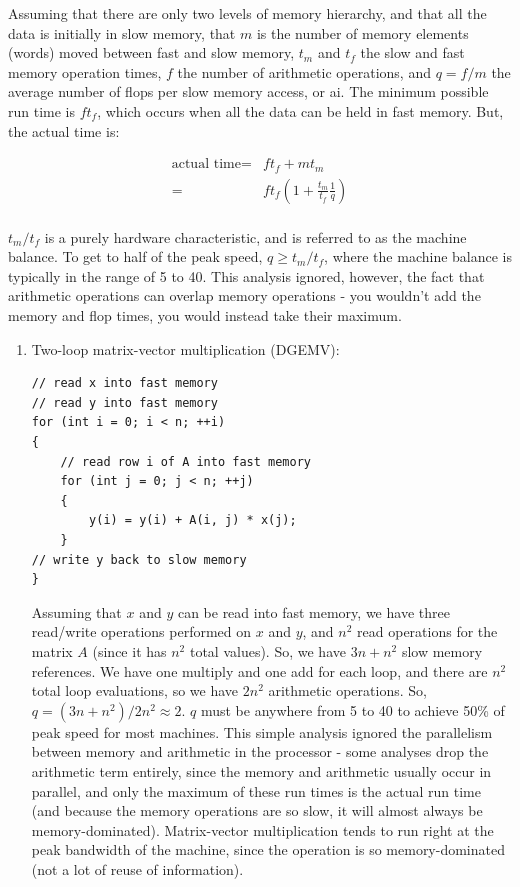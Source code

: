 \documentclass[10pt]{article}
\begin{document}
\begin{flushleft}
Assuming that there are only two levels of memory hierarchy, and that all the data is initially in slow memory, that \(m\) is the number of memory elements (words) moved between fast and slow memory, \(t_m\) and \(t_f\) the slow and fast memory operation times, \(f\) the number of arithmetic operations, and \(q=f/m\) the average number of flops per slow memory access, or \gls{ai}. The minimum possible run time is \(ft_f\), which occurs when all the data can be held in fast memory. But, the actual time is:

\begin{equation}
\begin{aligned}
\textrm{actual time}=& ft_f+mt_m\\
=& ft_f\left(1+\frac{t_m}{t_f}\frac{1}{q}\right)\\
\end{aligned}
\end{equation}

\(t_m/t_f\) is a purely hardware characteristic, and is referred to as the machine balance. To get to half of the peak speed, \(q\geq t_m/t_f\), where the machine balance is typically in the range of 5 to 40. This analysis ignored, however, the fact that arithmetic operations can overlap memory operations - you wouldn't add the memory and flop times, you would instead take their maximum.

\begin{enumerate}
\item Two-loop matrix-vector multiplication (DGEMV):

\begin{lstlisting}[basicstyle=\ttfamily\small]
// read x into fast memory
// read y into fast memory
for (int i = 0; i < n; ++i)
{
	// read row i of A into fast memory
	for (int j = 0; j < n; ++j)
	{
		y(i) = y(i) + A(i, j) * x(j);
	}
// write y back to slow memory
}
\end{lstlisting}

Assuming that \(x\) and \(y\) can be read into fast memory, we have three read/write operations performed on \(x\) and \(y\), and \(n^2\) read operations for the matrix \(A\) (since it has \(n^2\) total values). So, we have \(3n+n^2\) slow memory references. We have one multiply and one add for each loop, and there are \(n^2\) total loop evaluations, so we have \(2n^2\) arithmetic operations. So, \(q=(3n+n^2)/2n^2\approx2\). \(q\) must be anywhere from 5 to 40 to achieve 50\% of peak speed for most machines. This simple analysis ignored the parallelism between memory and arithmetic in the processor - some analyses drop the arithmetic term entirely, since the memory and arithmetic usually occur in parallel, and only the maximum of these run times is the actual run time (and because the memory operations are so slow, it will almost always be memory-dominated). Matrix-vector multiplication tends to run right at the peak bandwidth of the machine, since the operation is so memory-dominated (not a lot of reuse of information).


\end{enumerate}
\end{flushleft}
\end{document}
